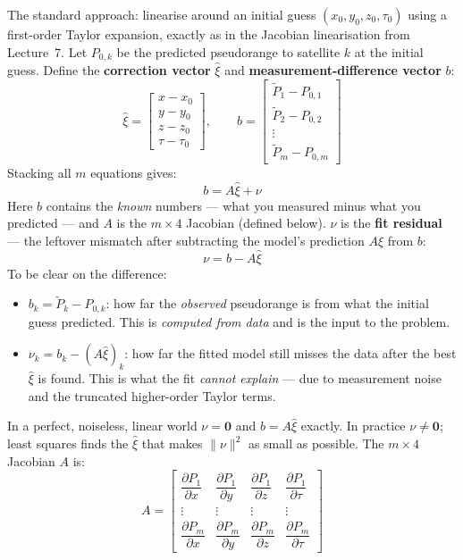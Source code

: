 \documentclass[12pt, a4paper]{article}
\begin{document}
The standard approach: linearise around an initial guess
$(x_0,y_0,z_0,\tau_0)$ using a first-order Taylor expansion, exactly as
in the Jacobian linearisation from Lecture~7.
Let $P_{0,k}$ be the predicted pseudorange to satellite $k$ at the initial
guess.
Define the \textbf{correction vector} $\hat{\xi}$ and
\textbf{measurement-difference vector} $b$:
\[
  \hat{\xi} =
  \begin{bmatrix} x - x_0 \\ y - y_0 \\ z - z_0 \\ \tau - \tau_0
  \end{bmatrix}, \qquad
  b =
  \begin{bmatrix} \tilde{P}_1 - P_{0,1} \\ \tilde{P}_2 - P_{0,2} \\
    \vdots \\ \tilde{P}_m - P_{0,m}
  \end{bmatrix}
\]
Stacking all $m$ equations gives:
\[
  b = A\hat{\xi} + \nu
\]
Here $b$ contains the \emph{known} numbers --- what you measured minus what
you predicted --- and $A$ is the $m \times 4$ Jacobian (defined below).
$\nu$ is the \textbf{fit residual} --- the leftover mismatch after
subtracting the model's prediction $A\hat{\xi}$ from $b$:
\[
  \nu = b - A\hat{\xi}
\]
To be clear on the difference:
\begin{itemize}[leftmargin=1.5em, itemsep=2pt]
  \item $b_k = \tilde{P}_k - P_{0,k}$: how far the \emph{observed}
    pseudorange is from what the initial guess predicted.
    This is \emph{computed from data} and is the input to the problem.
  \item $\nu_k = b_k - (A\hat{\xi})_k$: how far the fitted model still
    misses the data after the best $\hat{\xi}$ is found.
    This is what the fit \emph{cannot explain} --- due to measurement noise
    and the truncated higher-order Taylor terms.
\end{itemize}
In a perfect, noiseless, linear world $\nu = \mathbf{0}$ and
$b = A\hat{\xi}$ exactly.
In practice $\nu \neq \mathbf{0}$; least squares finds the $\hat{\xi}$
that makes $\|\nu\|^2$ as small as possible.
The $m \times 4$ Jacobian $A$ is:
\[
  A =
  \begin{bmatrix}
    \dfrac{\partial P_1}{\partial x} & \dfrac{\partial P_1}{\partial y} &
    \dfrac{\partial P_1}{\partial z} & \dfrac{\partial P_1}{\partial\tau}
    \\[8pt]
    \vdots & \vdots & \vdots & \vdots \\[4pt]
    \dfrac{\partial P_m}{\partial x} & \dfrac{\partial P_m}{\partial y} &
    \dfrac{\partial P_m}{\partial z} & \dfrac{\partial P_m}{\partial\tau}
  \end{bmatrix}
\]
\end{document}
